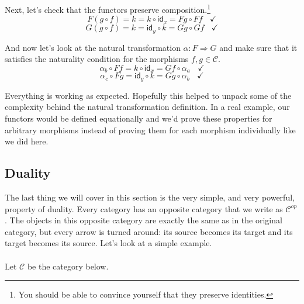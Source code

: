 \documentclass[12pt]{article}
\newcounter{examp}
\begin{document}
Next, let's check that the functors preserve composition.\footnote{You should be able to convince yourself that they preserve identities.}
$$F(g\circ f) = k = k \circ \mathsf{id}_x = Fg \circ Ff \ \ \ \ \checkmark$$
$$G(g \circ f) = k = \mathsf{id}_y \circ k = Gg \circ Gf \ \ \ \ \checkmark$$


And now let's look at the natural transformation $\alpha: F \Rightarrow G$ and make sure that it satisfies the naturality condition for the morphisms $f,g \in \mathcal{C}$.
$$\alpha_b \circ Ff = k \circ \mathsf{id}_x = Gf \circ \alpha_a \ \ \ \ \checkmark$$
$$\alpha_c \circ Fg = \mathsf{id}_y \circ k = Gg \circ \alpha_b \ \ \ \ \checkmark$$

Everything is working as expected.
Hopefully this helped to unpack some of the complexity behind the natural transformation definition.
In a real example, our functors would be defined equationally and we'd prove these properties for arbitrary morphisms instead of proving them for each morphism individually like we did here.


\subsection*{Duality}
The last thing we will cover in this section is the very simple, and very powerful, property of duality.
Every category has an opposite category that we write as $\mathcal{C}^{op}$.
The objects in this opposite category are exactly the same as in the original category, but every arrow is turned around: its source becomes its target and its target becomes its source.
Let's look at a simple example.\\\\
Let $\mathcal{C}$ be the category below.
\end{document}
